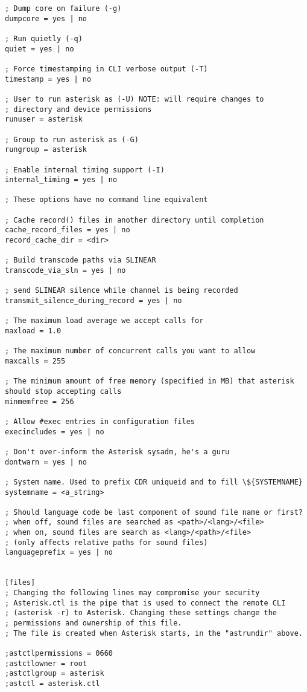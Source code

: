 \begin{verbatim}
; Dump core on failure (-g)
dumpcore = yes | no

; Run quietly (-q)
quiet = yes | no

; Force timestamping in CLI verbose output (-T)
timestamp = yes | no

; User to run asterisk as (-U) NOTE: will require changes to
; directory and device permissions
runuser = asterisk				

; Group to run asterisk as (-G)
rungroup = asterisk

; Enable internal timing support (-I)
internal_timing = yes | no

; These options have no command line equivalent

; Cache record() files in another directory until completion
cache_record_files = yes | no			
record_cache_dir = <dir>

; Build transcode paths via SLINEAR
transcode_via_sln = yes | no 			

; send SLINEAR silence while channel is being recorded
transmit_silence_during_record = yes | no

; The maximum load average we accept calls for
maxload = 1.0

; The maximum number of concurrent calls you want to allow
maxcalls = 255 

; The minimum amount of free memory (specified in MB) that asterisk should stop accepting calls
minmemfree = 256

; Allow #exec entries in configuration files
execincludes = yes | no

; Don't over-inform the Asterisk sysadm, he's a guru
dontwarn = yes | no

; System name. Used to prefix CDR uniqueid and to fill \${SYSTEMNAME}
systemname = <a_string>

; Should language code be last component of sound file name or first?
; when off, sound files are searched as <path>/<lang>/<file>
; when on, sound files are search as <lang>/<path>/<file>
; (only affects relative paths for sound files)
languageprefix = yes | no			


[files]
; Changing the following lines may compromise your security
; Asterisk.ctl is the pipe that is used to connect the remote CLI
; (asterisk -r) to Asterisk. Changing these settings change the
; permissions and ownership of this file. 
; The file is created when Asterisk starts, in the "astrundir" above.

;astctlpermissions = 0660
;astctlowner = root
;astctlgroup = asterisk
;astctl = asterisk.ctl

\end{verbatim}
